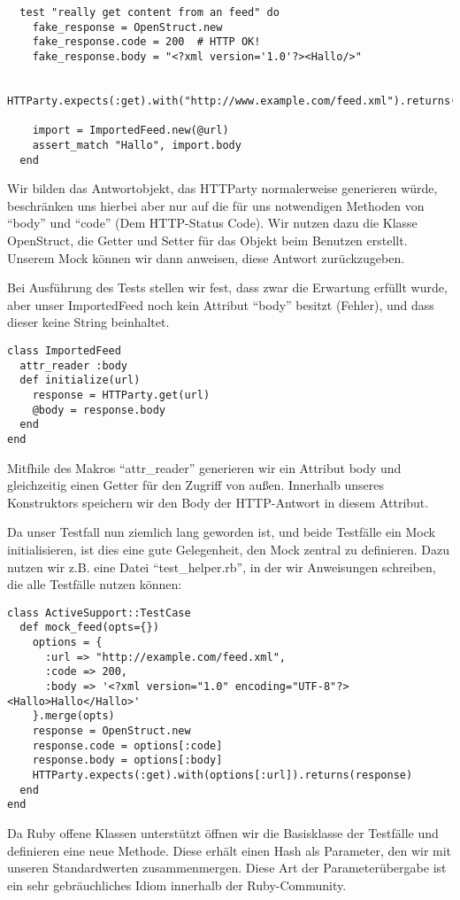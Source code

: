 \begin{lstlisting}
  test "really get content from an feed" do
    fake_response = OpenStruct.new
    fake_response.code = 200  # HTTP OK!
    fake_response.body = "<?xml version='1.0'?><Hallo/>"

    HTTParty.expects(:get).with("http://www.example.com/feed.xml").returns(fake_response)

    import = ImportedFeed.new(@url)
    assert_match "Hallo", import.body
  end 
\end{lstlisting}
Wir bilden das Antwortobjekt, das HTTParty normalerweise generieren würde, beschränken uns hierbei aber nur auf die für uns notwendigen Methoden von "`body"' und "`code"' (Dem HTTP-Status Code). Wir nutzen dazu die Klasse OpenStruct, die Getter und Setter für das Objekt beim Benutzen erstellt. Unserem Mock können wir dann anweisen, diese Antwort zurückzugeben.
\tddred

Bei Ausführung des Tests stellen wir fest, dass zwar die Erwartung erfüllt wurde, aber unser ImportedFeed noch kein Attribut "`body"' besitzt (Fehler), und dass dieser keine String beinhaltet.

\begin{lstlisting}
class ImportedFeed
  attr_reader :body
  def initialize(url)
    response = HTTParty.get(url)
    @body = response.body
  end
end  
\end{lstlisting}
\tddgreen
Mitfhile des Makros "`attr\_reader"' generieren wir ein Attribut body und gleichzeitig einen Getter für den Zugriff von außen. Innerhalb unseres Konstruktors speichern wir den Body der HTTP-Antwort in diesem Attribut.

\tddrefactor
Da unser Testfall nun ziemlich lang geworden ist, und beide Testfälle ein Mock initialisieren, ist dies eine gute Gelegenheit, den Mock zentral zu definieren. Dazu nutzen wir z.B. eine Datei "`test\_helper.rb"', in der wir Anweisungen schreiben, die alle Testfälle nutzen können:

\begin{lstlisting}
class ActiveSupport::TestCase
  def mock_feed(opts={})
    options = {
      :url => "http://example.com/feed.xml",
      :code => 200,
      :body => '<?xml version="1.0" encoding="UTF-8"?><Hallo>Hallo</Hallo>'
    }.merge(opts)
    response = OpenStruct.new
    response.code = options[:code]
    response.body = options[:body]
    HTTParty.expects(:get).with(options[:url]).returns(response)
  end
end
\end{lstlisting}
Da Ruby offene Klassen unterstützt öffnen wir die Basisklasse der Testfälle und definieren eine neue Methode. Diese erhält einen Hash als Parameter, den wir mit unseren Standardwerten zusammenmergen. Diese Art der Parameterübergabe ist ein sehr gebräuchliches Idiom innerhalb der Ruby-Community.

